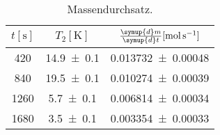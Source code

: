 \begin{table}
  \centering
  \caption{Massendurchsatz.}
  \label{tab:tabelle3}
\begin{tabular}{c c c}
  \toprule
  {$t [\si{\second}]$} & {$T_2 [\si{\kelvin}]$} & {$\frac{\symup{d} m}{\symup{d} t} [\si{\mol\per\second}]$}\\
  \midrule
  \num{420} & \num{14.9 +- 0.1} & \num{0.013732 +- 0.00048} \\
  \num{840} & \num{19.5 +- 0.1} & \num{0.010274 +- 0.00039}\\
  \num{1260} & \num{5.7 +- 0.1} & \num{0.006814 +- 0.00034}  \\
  \num{1680} & \num{3.5 +- 0.1} & \num{0.003354 +- 0.00033} \\
  \bottomrule
\end{tabular}
\end{table}
